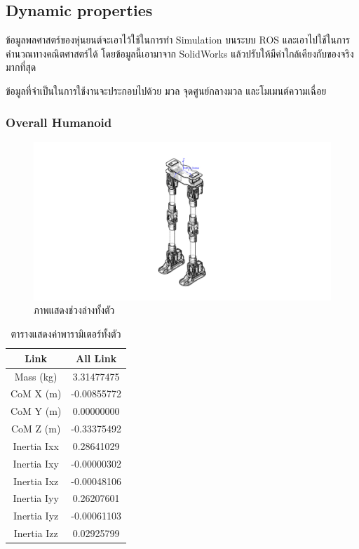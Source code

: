 \newcommand{\addprop}[9]{
	CoM X (m) & #1\\
	CoM Y (m) & #2\\
	CoM Z (m) & #3\\
	Inertia Ixx & #4\\
	Inertia Ixy & #5\\
	Inertia Ixz & #6\\
	Inertia Iyy & #7\\
	Inertia Iyz & #8\\
	Inertia Izz & #9\\
}

\subsection{Dynamic properties}
ข้อมูลพลศาสตร์ของหุ่นยนต์จะเอาไว้ใช้ในการทำ Simulation บนระบบ ROS และเอาไปใช้ในการคำนวณทางคณิตศาสตร์ได้
โดยข้อมูลนี้เอามาจาก SolidWorks แล้วปรับให้มีค่าใกล้เคียงกับของจริงมากที่สุด

ข้อมูลที่จำเป็นในการใช้งานจะประกอบไปด้วย มวล จุดศูนย์กลางมวล และโมเมนต์ความเฉื่อย

\subsubsection*{Overall Humanoid}
\begin{figure}[!ht]
	\centering
	\includegraphics[width=\textwidth]{chapter3/images/uthai_dynamic_all.jpeg}
	\caption{ภาพแสดงช่วงล่างทั้งตัว}
	\label{fig:uthai_dynamic_all}
\end{figure}
\begin{table}[!ht]
	\centering
	\begin{tabular}{| c | c |}
		\hline
		Link & All Link\\
		\hline
		Mass (kg) & 3.31477475 \\
		\addprop{-0.00855772}{0.00000000}{-0.33375492}{0.28641029}{-0.00000302}{-0.00048106}{0.26207601}{-0.00061103}{0.02925799}
		\hline
	\end{tabular}
	\caption{ตารางแสดงค่าพารามิเตอร์ทั้งตัว}
	\label{tab:uthai_dynamic_all}
\end{table}


